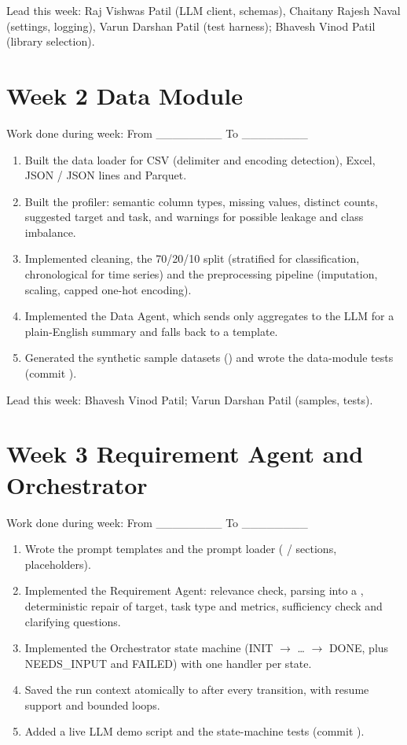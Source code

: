 Lead this week: Raj Vishwas Patil (LLM client, schemas), Chaitany Rajesh Naval (settings, logging), Varun Darshan Patil (test harness); Bhavesh Vinod Patil (library selection).

\FloatBarrier
\setcounter{secnumdepth}{0}
\section{Week 2 \textemdash{} Data Module}
\setcounter{secnumdepth}{2}

Work done during week: From \_\_\_\_\_\_\_\_ To \_\_\_\_\_\_\_\_

\begin{enumerate}
  \item Built the data loader for CSV (delimiter and encoding detection), Excel, JSON / JSON lines and Parquet.
  \item Built the profiler: semantic column types, missing values, distinct counts, suggested target and task, and warnings for possible leakage and class imbalance.
  \item Implemented cleaning, the 70/20/10 split (stratified for classification, chronological for time series) and the preprocessing pipeline (imputation, scaling, capped one-hot encoding).
  \item Implemented the Data Agent, which sends only aggregates to the LLM for a plain-English summary and falls back to a template.
  \item Generated the synthetic sample datasets () and wrote the data-module tests (commit ).
\end{enumerate}

Lead this week: Bhavesh Vinod Patil; Varun Darshan Patil (samples, tests).

\FloatBarrier
\setcounter{secnumdepth}{0}
\section{Week 3 \textemdash{} Requirement Agent and Orchestrator}
\setcounter{secnumdepth}{2}

Work done during week: From \_\_\_\_\_\_\_\_ To \_\_\_\_\_\_\_\_

\begin{enumerate}
  \item Wrote the prompt templates and the prompt loader ( /  sections,  placeholders).
  \item Implemented the Requirement Agent: relevance check, parsing into a , deterministic repair of target, task type and metrics, sufficiency check and clarifying questions.
  \item Implemented the Orchestrator state machine (INIT \ensuremath{\rightarrow} \ldots{} \ensuremath{\rightarrow} DONE, plus NEEDS\_INPUT and FAILED) with one handler per state.
  \item Saved the run context atomically to  after every transition, with resume support and bounded loops.
  \item Added a live LLM demo script and the state-machine tests (commit ).
\end{enumerate}

